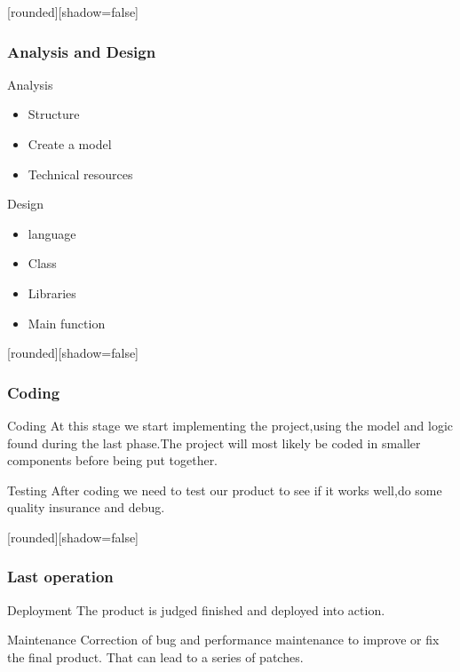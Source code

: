 \documentclass[10pt]{beamer}
\begin{document}
\begin{frame}
[rounded][shadow=false]
\frametitle{Analysis and Design}

\begin{block}{Analysis}
\begin{itemize}

    \item Structure
        
    \item Create a model
        
    \item Technical resources
        
\end{itemize}
\end{block}
\begin{block}{Design}
\begin{itemize}

    \item language
        
    \item Class
        
    \item Libraries
    
    \item Main function
        
\end{itemize}
\end{block}
\end{frame}


\begin{frame}
[rounded][shadow=false]
\frametitle{Coding}
\begin{block}{Coding}
At this stage we start implementing the project,using the model and logic found during the last phase.The project will most likely be coded in smaller components before being put together.
\end{block}

\begin{block}{Testing}
After coding we need to test our product to see if it works well,do some quality insurance and debug.
\end{block}
\end{frame}

\begin{frame}
[rounded][shadow=false]
\frametitle{Last operation}
\begin{block}{Deployment}
The product is judged finished and deployed into action.
\end{block}
\begin{block}{Maintenance}
Correction of bug and performance maintenance to improve or fix the final product. That can lead to a series of patches. 
\end{block}
    

\end{frame}
\end{document}
